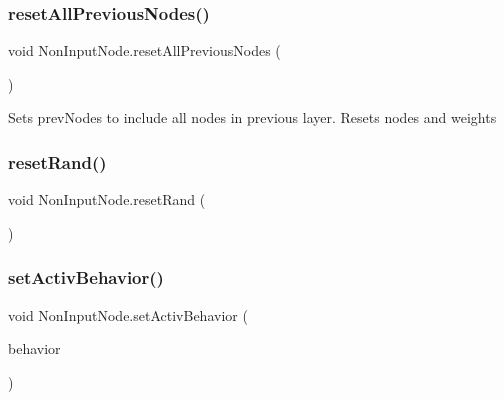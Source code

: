 \mbox{\label{class_non_input_node_a703986aac246746c6269522d7a03e13e}} 
\subsubsection{\texorpdfstring{reset\+All\+Previous\+Nodes()}{resetAllPreviousNodes()}}
{\footnotesize\ttfamily void Non\+Input\+Node.\+reset\+All\+Previous\+Nodes (\begin{DoxyParamCaption}{ }\end{DoxyParamCaption})}



Sets prev\+Nodes to include all nodes in previous layer. Resets nodes and weights 

\mbox{\label{class_non_input_node_a7d9c289b2c8d666a3d9ae69e1f536cfa}} 
\subsubsection{\texorpdfstring{reset\+Rand()}{resetRand()}}
{\footnotesize\ttfamily void Non\+Input\+Node.\+reset\+Rand (\begin{DoxyParamCaption}{ }\end{DoxyParamCaption})}

\mbox{\label{class_non_input_node_a44be3d4caebaa9f9fc8d6c9659bdb674}} 
\subsubsection{\texorpdfstring{set\+Activ\+Behavior()}{setActivBehavior()}}
{\footnotesize\ttfamily void Non\+Input\+Node.\+set\+Activ\+Behavior (\begin{DoxyParamCaption}\item[{\mbox{\hyperlink{interface_activation_behavior}{Activation\+Behavior}}}]{behavior }\end{DoxyParamCaption})}



